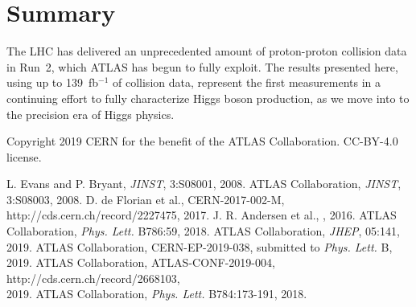 \documentclass{moriond}
\def\tth{\ensuremath{t\bar{t}H}\xspace}
\begin{document}


\section{Summary}

The LHC has delivered an unprecedented amount of proton-proton collision data in Run~2, which ATLAS has begun to
fully exploit. The results presented here, using up to 139~fb$^{-1}$ of collision data,
represent the first measurements in a continuing effort to fully characterize Higgs boson production,
as we move into to the precision era of Higgs physics.

\phantom{.}

\noindent
Copyright 2019 CERN for the benefit of the ATLAS Collaboration. CC-BY-4.0 license.

\begin{thebibliography}{99}
 L. Evans and P. Bryant, {\em JINST}, 3:S08001, 2008.
 ATLAS Collaboration, {\em JINST}, 3:S08003, 2008.
 D. de Florian et al., CERN-2017-002-M, http://cds.cern.ch/record/2227475, 2017.
 J. R. Andersen et al., \href{http://arxiv.org/abs/1605.04692}{\color{black}{arXiv:1605.04692}}, 2016.
 ATLAS Collaboration, {\em Phys. Lett.} B786:59, 2018.
 ATLAS Collaboration, {\em JHEP}, 05:141, 2019.
 ATLAS Collaboration, CERN-EP-2019-038, submitted to {\em Phys. Lett.} B, 2019.
 ATLAS Collaboration, ATLAS-CONF-2019-004, http://cds.cern.ch/record/2668103,\\ 2019.
 ATLAS Collaboration, {\em Phys. Lett.} B784:173-191, 2018.
\end{thebibliography}

%
\end{document}
